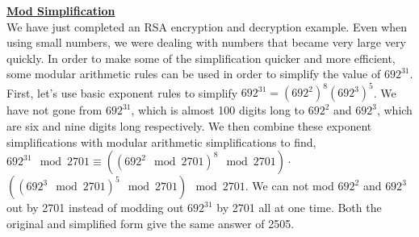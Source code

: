\documentclass[12pt,final]{article}
\begin{document}
\begin{center}
\begin{center}
\begin{center}
\end{center}
\end{center}
\begin{center}
\underline{\textbf{Mod Simplification}}\\
We have just completed an RSA encryption and decryption example. Even when using small numbers, we were dealing with numbers that became very large very quickly. In order to make some of the simplification quicker and more efficient, some modular arithmetic rules can be used in order to simplify the value of $692^{31}$. First, let's use basic exponent rules to simplify $692^{31}=(692^2)^8(692^3)^5$. We have not gone from $692^{31}$, which is almost 100 digits long to $692^2$ and $692^3$, which are six and nine digits long respectively. We then combine these exponent simplifications with modular arithmetic simplifications to find, $692^{31} \mod 2701 \equiv ((692^2 \mod 2701)^8 \mod 2701)\cdot$ $((692^3 \mod 2701)^5 \mod 2701) \mod 2701 $. We can not mod $692^2$ and $692^3$ out by 2701 instead of modding out $692^{31}$ by 2701 all at one time. Both the original and simplified form give the same answer of 2505.

\end{center}
\begin{center}

\end{center}
\end{center}
\end{document}
